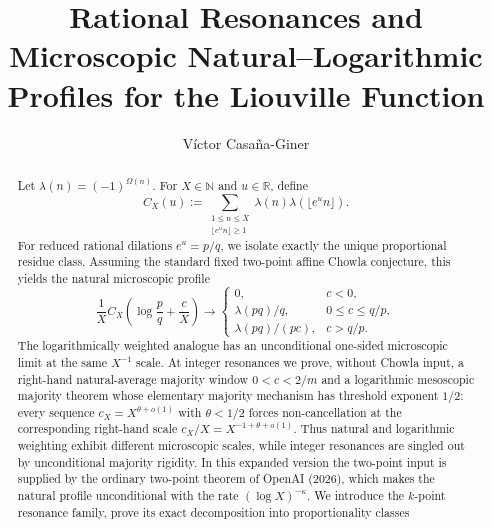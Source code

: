 \documentclass[preprint,12pt]{elsarticle}
\numberwithin{equation}{section}
\theoremstyle{plain}
\theoremstyle{definition}
\theoremstyle{definition}
\theoremstyle{remark}
\begin{document}
\begin{frontmatter}

\title{Rational Resonances and Microscopic Natural--Logarithmic Profiles for the Liouville Function}

\author[uned]{Víctor Casaña-Giner\texorpdfstring{}{}}

\begin{abstract}
Let $\lambda(n)=(-1)^{\Omega(n)}$. For $X\in\mathbb N$ and $u\in\mathbb R$, define
\begin{equation}
C_X(u):=\sum_{\substack{1\le n\le X\\ \lfloor e^u n\rfloor\ge1}}
\lambda(n)\lambda(\lfloor e^u n\rfloor).
\label{eq:o1}
\end{equation}
For reduced rational dilations $e^u=p/q$, we isolate exactly the unique
proportional residue class. Assuming the standard fixed two-point affine
Chowla conjecture, this yields the natural microscopic profile
\begin{equation}
\frac{1}{X}C_X\!\left(\log\frac pq+\frac cX\right)
\longrightarrow
\begin{cases}
0,&c<0,\\
\lambda(pq)/q,&0\le c\le q/p,\\
\lambda(pq)/(pc),&c>q/p.
\end{cases}
\label{eq:o2}
\end{equation}
The logarithmically weighted analogue has an unconditional one-sided
microscopic limit at the same $X^{-1}$ scale. At integer resonances we prove,
without Chowla input, a right-hand natural-average majority window
$0<c<2/m$ and a logarithmic mesoscopic majority theorem whose elementary
majority mechanism has threshold exponent $1/2$: every sequence
$c_X=X^{\theta+o(1)}$ with $\theta<1/2$ forces non-cancellation at the
corresponding right-hand scale $c_X/X=X^{-1+\theta+o(1)}$. Thus natural and logarithmic weighting exhibit different
microscopic scales, while integer resonances are singled out by unconditional
majority rigidity.
In this expanded version the two-point input is supplied by the ordinary
two-point theorem of OpenAI (2026), which makes the natural profile
unconditional with the rate $(\log X)^{-\kappa}$. We introduce the $k$-point
resonance family, prove its exact decomposition into proportionality classes

\end{abstract}
\end{frontmatter}
\end{document}
